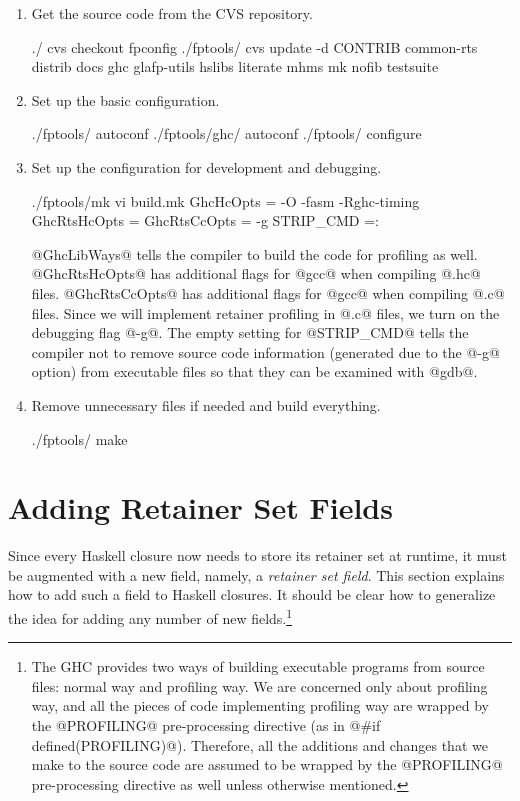 \documentclass{article}
\begin{document}
\begin{enumerate}
\item Get the source code from the CVS repository.
\begin{code}
./              cvs checkout fpconfig
./fptools/      cvs update -d CONTRIB common-rts distrib docs ghc glafp-utils 
                    hslibs literate mhms mk nofib testsuite
\end{code}

\item Set up the basic configuration.
\begin{code}
./fptools/      autoconf                    
./fptools/ghc/  autoconf
./fptools/      configure
\end{code}

\item Set up the configuration for development and debugging.
\begin{code}
./fptools/mk    vi build.mk
    GhcHcOpts = -O -fasm -Rghc-timing
    GhcRtsHcOpts = 
    GhcRtsCcOpts = -g
    STRIP_CMD =:
\end{code}
@GhcLibWays@ tells the compiler to build the code for profiling as well.
@GhcRtsHcOpts@ has additional flags for @gcc@ when compiling @.hc@ files.
@GhcRtsCcOpts@ has additional flags for @gcc@ when compiling @.c@ files.
Since we will implement retainer profiling in @.c@ files, we turn on the 
debugging flag @-g@. 
The empty setting for @STRIP_CMD@ tells the compiler not to remove source code
information (generated due to the @-g@ option) from executable files so that
they can be examined with @gdb@.

\item Remove unnecessary files if needed and build everything.
\begin{code}
./fptools/      make
\end{code}
\end{enumerate}

\section{Adding Retainer Set Fields}

Since every Haskell closure now needs to store its retainer set at runtime, 
it must be augmented with a new field,
namely, a \emph{retainer set field}.
This section explains how to add such a field to Haskell closures.
It should be clear how to generalize the idea for adding 
any number of new fields.\footnote{The GHC provides two 
ways of building executable programs from 
source files: normal way and profiling way. 
We are concerned only about profiling way, and all the pieces of code 
implementing profiling way are wrapped by the @PROFILING@ 
pre-processing directive (as in @\#if defined(PROFILING)@).
Therefore, all the additions and changes that we make to the source code 
are assumed to be wrapped by the @PROFILING@ pre-processing 
directive as well unless otherwise mentioned.}
\end{document}
